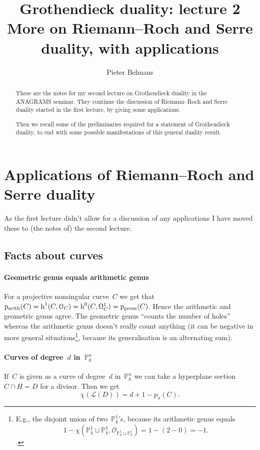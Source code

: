 \documentclass[10pt,a4paper]{article}
\title{Grothendieck duality: lecture 2 \\[.2em] \Large More on Riemann--Roch and Serre duality, with applications}
\author{Pieter Belmans}
\begin{document}
\maketitle

\begin{abstract}
  These are the notes for my second lecture on Grothendieck duality in the ANAGRAMS seminar. They continue the discussion of Riemann--Roch and Serre duality started in the first lecture, by giving some applications.

  Then we recall some of the preliminaries required for a statement of Grothendieck duality, to end with some possible manifestations of this general duality result.
\end{abstract}

\tableofcontents

\clearpage


\section{Applications of Riemann--Roch and Serre duality}
\label{section:applications}
As the first lecture didn't allow for a discussion of any applications I have moved these to (the notes of) the second lecture.

\subsection{Facts about curves}
\label{subsection:facts-curves}
\paragraph{Geometric genus equals arithmetic genus}
For a projective nonsingular curve~$C$ we get that~$\mathrm{p}_{\mathrm{arith}}(C)=\operatorname{h}^1(C,\mathcal{O}_C)=\operatorname{h}^0(C,\Omega_C^1)=\mathrm{p}_{\mathrm{geom}}(C)$. Hence the arithmetic and geometric genus agree. The geometric genus ``counts the number of holes'' whereas the arithmetic genus doesn't really count anything (it can be negative in more general situations\footnote{E.g., the disjoint union of two~$\mathbb{P}_k^1$'s, because its arithmetic genus equals\begin{equation}1-\chi(\mathbb{P}_k^1\sqcup\mathbb{P}_k^1,\mathcal{O}_{\mathbb{P}_k^1\sqcup\mathbb{P}_k^1})=1-(2-0)=-1.\end{equation}.}, because its generalisation is an alternating sum).

\paragraph{Curves of degree~$d$ in~$\mathbb{P}_k^n$}
If~$C$ is given as a curve of degree~$d$ in~$\mathbb{P}_k^n$ we can take a hyperplane section~$C\cap H=D$ for a divisor. Then we get
\begin{equation}
  \chi(\mathcal{L}(D))=d+1-\mathrm{p}_{\mathrm{a}}(C).
\end{equation}
\end{document}
